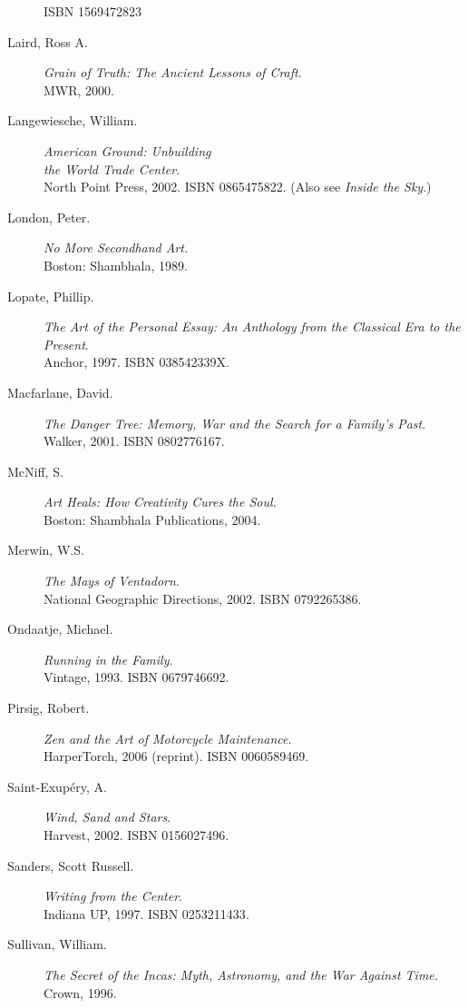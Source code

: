 \documentclass[letterpaper,10pt,headsepline]{scrreprt}
\begin{document}
\begin{description}
  \textsc{ISBN 1569472823}
\item [Laird, Ross A.] \textit{Grain of Truth: The Ancient Lessons of Craft}. \\MWR, 2000.
\item [Langewiesche, William.] \textit{American Ground: Unbuilding
    \\the World Trade Center}. \\North Point Press, 2002.
  \textsc{ISBN 0865475822}. (Also see \textit{Inside the Sky}.)
\item [London, Peter.] \textit{No More Secondhand Art.} 
\\Boston: Shambhala, 1989.
\item [Lopate, Phillip.] \textit{The Art of the Personal Essay: An
    Anthology from the Classical Era to the Present}. \\Anchor, 1997.
  \textsc{ISBN 038542339X}.
\item [Macfarlane, David.] \textit{The Danger Tree: Memory, War and
    the Search for a Family's Past}. \\Walker, 2001. \textsc{ISBN
    0802776167}.
\item[McNiff, S.] \textit{Art Heals: How Creativity Cures the Soul.} \\Boston: Shambhala Publications, 2004.
\item [Merwin, W.S.] \textit{The Mays of Ventadorn}. \\National
  Geographic Directions, 2002. \textsc{ISBN 0792265386}.
\item [Ondaatje, Michael.] \textit{Running in the Family}. \\Vintage,
  1993. \textsc{ISBN 0679746692}.
\item [Pirsig, Robert.] \textit{Zen and the Art of Motorcycle
    Maintenance}. \\HarperTorch, 2006 (reprint). \textsc{ISBN
    0060589469}.
\item [Saint-Exup\'ery, A.] \textit{Wind, Sand and Stars}. \\Harvest,
  2002. \textsc{ISBN 0156027496}.
\item [Sanders, Scott Russell.] \textit{Writing from the Center}.
  \\Indiana UP, 1997. \textsc{ISBN 0253211433}.
\item [Sullivan, William.] \textit{The Secret of the Incas: Myth,
    Astronomy, and the War Against Time.} \\Crown, 1996.

\end{description}
\end{document}
